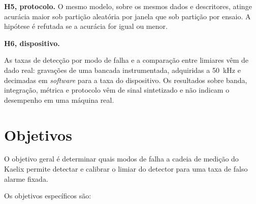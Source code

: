 \textbf{H5, protocolo.} O mesmo modelo, sobre os mesmos dados e descritores, atinge
        acurácia maior sob partição aleatória por janela que sob partição por ensaio. A
        hipótese é refutada se a acurácia for igual ou menor.

\textbf{H6, dispositivo.} 

As taxas de detecção por modo de falha e a comparação entre limiares vêm de dado real: gravações
de uma bancada instrumentada, adquiridas a \SI{50}{\kilo\hertz} e decimadas em \emph{software}
para a taxa do dispositivo. Os resultados sobre banda, integração, métrica e protocolo vêm de sinal
sintetizado e não indicam o desempenho em uma máquina real. 

\section{Objetivos}
\label{sec:intro-objetivos}

O objetivo geral é determinar quais modos de falha a cadeia de medição do Kaelix permite
detectar e calibrar o limiar do detector para uma taxa de falso alarme fixada.

Os objetivos específicos são:

